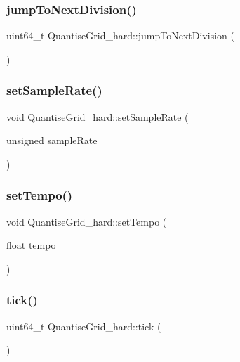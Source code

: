 \subsubsection{\texorpdfstring{jump\+To\+Next\+Division()}{jumpToNextDivision()}}
{\footnotesize\ttfamily uint64\+\_\+t Quantise\+Grid\+\_\+hard\+::jump\+To\+Next\+Division (\begin{DoxyParamCaption}{ }\end{DoxyParamCaption})}

\mbox{\label{classQuantiseGrid__hard_abc6cae6bd566390974d8ea6f17d9ade5}} 
\subsubsection{\texorpdfstring{set\+Sample\+Rate()}{setSampleRate()}}
{\footnotesize\ttfamily void Quantise\+Grid\+\_\+hard\+::set\+Sample\+Rate (\begin{DoxyParamCaption}\item[{unsigned}]{sample\+Rate }\end{DoxyParamCaption})}

\mbox{\label{classQuantiseGrid__hard_a0d56cd9876243687506a08e8044f177c}} 
\subsubsection{\texorpdfstring{set\+Tempo()}{setTempo()}}
{\footnotesize\ttfamily void Quantise\+Grid\+\_\+hard\+::set\+Tempo (\begin{DoxyParamCaption}\item[{float}]{tempo }\end{DoxyParamCaption})}

\mbox{\label{classQuantiseGrid__hard_a0303c9a37394b191715fac5aafb51ea6}} 
\subsubsection{\texorpdfstring{tick()}{tick()}}
{\footnotesize\ttfamily uint64\+\_\+t Quantise\+Grid\+\_\+hard\+::tick (\begin{DoxyParamCaption}{ }\end{DoxyParamCaption})}



